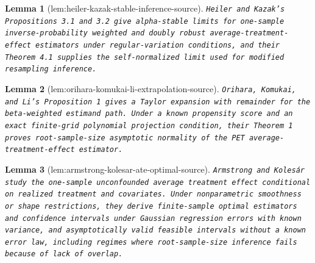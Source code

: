 \documentclass{article}
\newtheorem{lemma}{Lemma}
\begin{document}
\begin{lemma}[lem:heiler-kazak-stable-inference-source]\label{lem:heiler-kazak-stable-inference-source}
\texttt{Heiler and Kazak's Propositions 3.1 and 3.2 give alpha-\allowbreak{}stable limits for one-\allowbreak{}sample inverse-\allowbreak{}probability weighted and doubly robust average-\allowbreak{}treatment-\allowbreak{}effect estimators under regular-\allowbreak{}variation conditions,\allowbreak{} and their Theorem 4.1 supplies the self-\allowbreak{}normalized limit used for modified resampling inference.}
\end{lemma}

\begin{lemma}[lem:orihara-komukai-li-extrapolation-source]\label{lem:orihara-komukai-li-extrapolation-source}
\texttt{Orihara,\allowbreak{} Komukai,\allowbreak{} and Li's Proposition 1 gives a Taylor expansion with remainder for the beta-\allowbreak{}weighted estimand path. Under a known propensity score and an exact finite-\allowbreak{}grid polynomial projection condition,\allowbreak{} their Theorem 1 proves root-\allowbreak{}sample-\allowbreak{}size asymptotic normality of the PET average-\allowbreak{}treatment-\allowbreak{}effect estimator.}
\end{lemma}

\begin{lemma}[lem:armstrong-kolesar-ate-optimal-source]\label{lem:armstrong-kolesar-ate-optimal-source}
\texttt{Armstrong and Kolesár study the one-\allowbreak{}sample unconfounded average treatment effect conditional on realized treatment and covariates. Under nonparametric smoothness or shape restrictions,\allowbreak{} they derive finite-\allowbreak{}sample optimal estimators and confidence intervals under Gaussian regression errors with known variance,\allowbreak{} and asymptotically valid feasible intervals without a known error law,\allowbreak{} including regimes where root-\allowbreak{}sample-\allowbreak{}size inference fails because of lack of overlap.}
\end{lemma}
\end{document}
